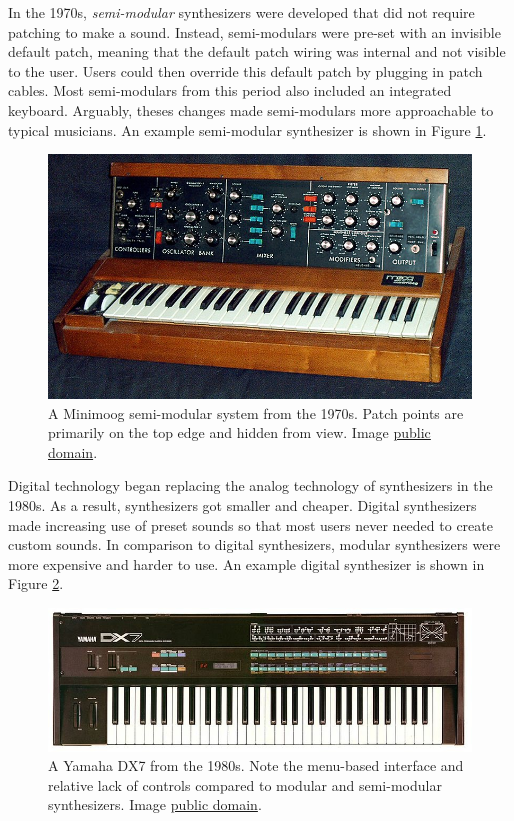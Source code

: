 \documentclass[
]{book}
\begin{document}
In the 1970s, \emph{semi-modular} synthesizers were developed that did not require patching to make a sound.
Instead, semi-modulars were pre-set with an invisible default patch, meaning that the default patch wiring was internal and not visible to the user.
Users could then override this default patch by plugging in patch cables.
Most semi-modulars from this period also included an integrated keyboard.
Arguably, theses changes made semi-modulars more approachable to typical musicians.
An example semi-modular synthesizer is shown in Figure \ref{fig:semi-modular}.



\begin{figure}
\includegraphics[width=1\linewidth]{images/800px-Minimoog} \caption{A Minimoog semi-modular system from the 1970s. Patch points are primarily on the top edge and hidden from view. Image \href{https://commons.wikimedia.org/wiki/File:Minimoog.JPG}{public domain}.}\label{fig:semi-modular}
\end{figure}

Digital technology began replacing the analog technology of synthesizers in the 1980s.
As a result, synthesizers got smaller and cheaper.
Digital synthesizers made increasing use of preset sounds so that most users never needed to create custom sounds.
In comparison to digital synthesizers, modular synthesizers were more expensive and harder to use.
An example digital synthesizer is shown in Figure \ref{fig:dx7}.



\begin{figure}
\includegraphics[width=1\linewidth]{images/YAMAHA_DX7} \caption{A Yamaha DX7 from the 1980s. Note the menu-based interface and relative lack of controls compared to modular and semi-modular synthesizers. Image \href{https://commons.wikimedia.org/wiki/File:YAMAHA_DX7.jpg}{public domain}.}\label{fig:dx7}
\end{figure}
\end{document}
